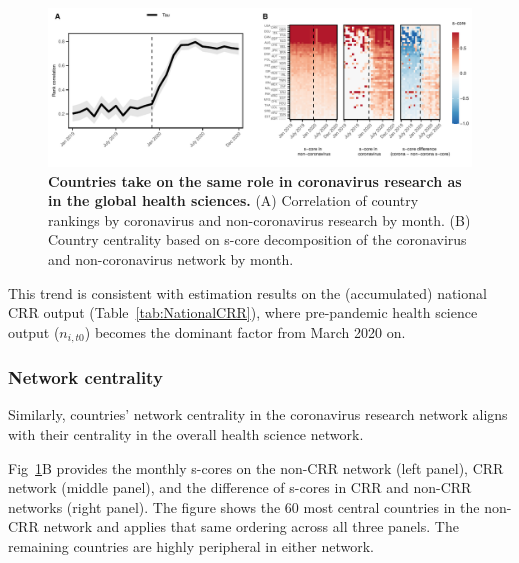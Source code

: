 \begin{figure}[!h]
\includegraphics[width=\textwidth]{1_chapter1/figures/Fig3.pdf} %
\caption{{\bf Countries take on the same role in coronavirus research as in the global health sciences.}
{\small (A) Correlation of country rankings by coronavirus and non-coronavirus research by month. (B) Country centrality based on s-core decomposition of the coronavirus and non-coronavirus network by month.}}
\label{figure2} 
\end{figure}


This trend is consistent with estimation results on the (accumulated) national CRR output (Table~\ref{tab:NationalCRR}), where pre-pandemic health science output ($n_{i,t0}$) becomes the dominant factor from March 2020 on. 


\subsubsection{Network centrality}

Similarly, countries' network centrality in the coronavirus research network aligns with their centrality in the overall health science network. 

Fig~\ref{figure2}B provides the monthly s-cores on the non-CRR network (left panel), CRR network (middle panel), and the difference of s-cores in CRR and non-CRR networks (right panel). The figure shows the 60 most central countries in the non-CRR network and applies that same ordering across all three panels. The remaining countries are highly peripheral in either network. 

